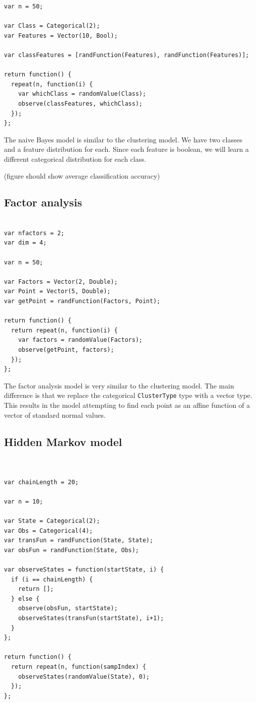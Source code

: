 \documentclass{article}
\begin{document}
{\small
\begin{verbatim}
var n = 50;

var Class = Categorical(2);
var Features = Vector(10, Bool);

var classFeatures = [randFunction(Features), randFunction(Features)];

return function() {
  repeat(n, function(i) {
    var whichClass = randomValue(Class);
    observe(classFeatures, whichClass);
  });
};
\end{verbatim}
}

The naive Bayes model is similar to the clustering model.  We have two classes and a feature
distribution for each.  Since each feature is boolean, we will learn
a different categorical distribution for each class.

(figure should show average classification accuracy)

  \subsection{Factor analysis}
{\small
\begin{verbatim}

var nfactors = 2;
var dim = 4;

var n = 50;

var Factors = Vector(2, Double);
var Point = Vector(5, Double);
var getPoint = randFunction(Factors, Point);

return function() {
  return repeat(n, function(i) {
    var factors = randomValue(Factors);
    observe(getPoint, factors);
  });
};
\end{verbatim}
}

The factor analysis model is very similar to the clustering model.  The main difference is that we replace the categorical \texttt{ClusterType} type with a vector type.  This results in the model attempting to find each point as an affine function of a vector of standard normal values.

  \subsection{Hidden Markov model}
{\small
\begin{verbatim}


var chainLength = 20;

var n = 10;

var State = Categorical(2);
var Obs = Categorical(4);
var transFun = randFunction(State, State);
var obsFun = randFunction(State, Obs);

var observeStates = function(startState, i) {
  if (i == chainLength) {
    return [];
  } else {
    observe(obsFun, startState);
    observeStates(transFun(startState), i+1);
  }
};

return function() {
  return repeat(n, function(sampIndex) {
    observeStates(randomValue(State), 0);
  });
};
\end{verbatim}
}
\end{document}
